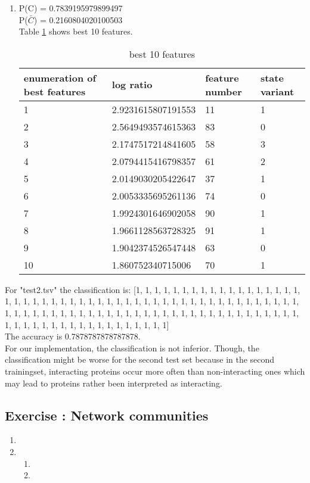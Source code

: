\documentclass[10pt,a4paper]{article}
\newcommand{\exercise}[1]
{
  \stepcounter{subsection}
  \subsection*{Exercise \thesubsection: #1}

}
\begin{document}
\begin{enumerate}
\item P(C) = 0.7839195979899497\\
P($\bar{C}$) = 0.2160804020100503\\
Table \ref{tab2} shows best 10 features.
\begin{table}[b]
\label{tab2}
\begin{tabular}{llll}
enumeration of best features & log ratio & feature number & state variant\\
\hline
1 & 2.9231615807191553 & 11 & 1\\
2 & 2.5649493574615363 & 83 & 0\\
3 & 2.1747517214841605 & 58 & 3\\
4 & 2.0794415416798357 & 61 & 2\\
5 & 2.0149030205422647 & 37 & 1\\
6 & 2.0053335695261136 & 74 & 0\\
7 & 1.9924301646902058 & 90 & 1\\
8 & 1.9661128563728325 & 91 & 1\\
9 & 1.9042374526547448 & 63 & 0\\
10 & 1.860752340715006 & 70 & 1\\
\end{tabular}
\caption{best 10 features}
\end{table}
\end{enumerate}
For "test2.tsv" the classification is: [1, 1, 1, 1, 1, 1, 1, 1, 1, 1, 1, 1, 1, 1, 1, 1, 1, 1, 1, 1, 1, 1, 1, 1, 1, 1, 1, 1, 1, 1, 1, 1, 1, 1, 1, 1, 1, 1, 1, 1, 1, 1, 1, 1, 1, 1, 1, 1, 1, 1, 1, 1, 1, 1, 1, 1, 1, 1, 1, 1, 1, 1, 1, 1, 1, 1, 1, 1, 1, 1, 1, 1, 1, 1, 1, 1, 1, 1, 1, 1, 1, 1, 1, 1, 1, 1, 1, 1, 1, 1, 1, 1, 1, 1, 1, 1, 1, 1, 1, 1]\\
The accuracy is 0.7878787878787878.\\
For our implementation, the classification is not inferior. Though, the classification might be worse for the second test set because in the second trainingset, interacting proteins occur more often than non-interacting ones which may lead to proteins rather been interpreted as interacting.

\exercise{Network communities}
\begin{enumerate}
\item 

\item
\begin{enumerate}
\item
\item
\end{enumerate}
\end{enumerate}
\end{document}

